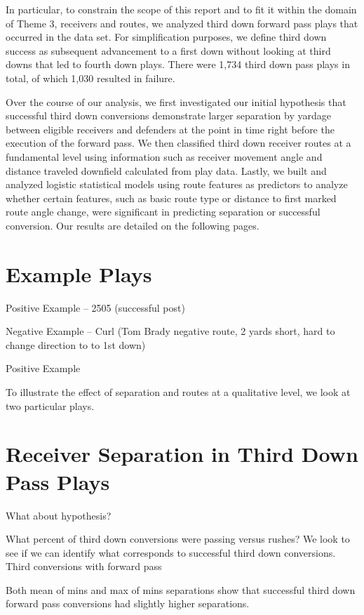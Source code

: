 \documentclass[12pt,letterpaper]{article}
\begin{document}
In particular, to constrain the scope of this report and to fit it within the domain of Theme 3, receivers and routes, we analyzed third down forward pass plays that occurred in the data set. For simplification purposes, we define third down success as subsequent advancement to a first down without looking at third downs that led to fourth down plays. There were 1,734 third down pass plays in total, of which 1,030 resulted in failure.

Over the course of our analysis, we first investigated our initial hypothesis that successful third down conversions demonstrate larger separation by yardage between eligible receivers and defenders at the point in time right before the execution of the forward pass. We then classified third down receiver routes at a fundamental level using information such as receiver movement angle and distance traveled downfield calculated from play data. Lastly, we built and analyzed logistic statistical models using route features as predictors to analyze whether certain features, such as basic route type or distance to first marked route angle change, were significant in predicting separation or successful conversion. Our results are detailed on the following pages.

\section*{Example Plays}

Positive Example -- 2505 (successful post)

Negative Example -- Curl (Tom Brady negative route, 2 yards short, hard to change direction to to 1st down)

Positive Example

To illustrate the effect of separation and routes at a qualitative level, we look at two particular plays.

\section*{Receiver Separation in Third Down Pass Plays}

What about hypothesis?

What percent of third down conversions were passing versus rushes? We look to see if we can identify what corresponds to successful third down conversions. Third conversions with forward pass

Both mean of mins and max of mins separations show that successful third down forward pass conversions had slightly higher separations.
\end{document}
